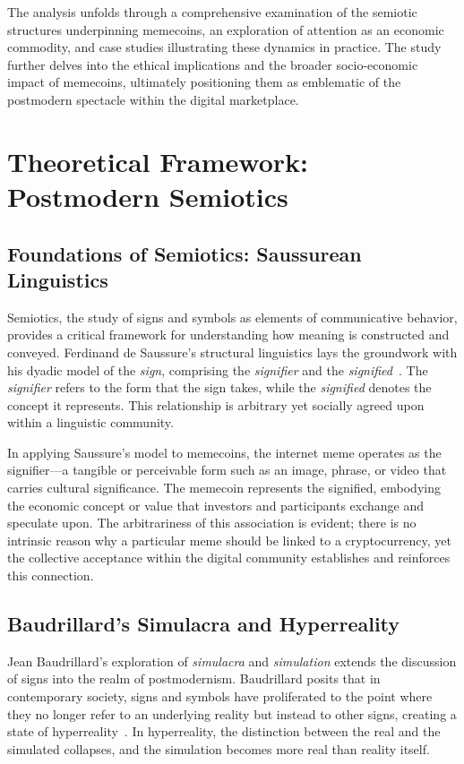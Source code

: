 \documentclass[a4paper,12pt]{article}
\begin{document}
The analysis unfolds through a comprehensive examination of the semiotic structures underpinning memecoins, an exploration of attention as an economic commodity, and case studies illustrating these dynamics in practice. The study further delves into the ethical implications and the broader socio-economic impact of memecoins, ultimately positioning them as emblematic of the postmodern spectacle within the digital marketplace.

\section{Theoretical Framework: Postmodern Semiotics}

\subsection{Foundations of Semiotics: Saussurean Linguistics}

Semiotics, the study of signs and symbols as elements of communicative behavior, provides a critical framework for understanding how meaning is constructed and conveyed. Ferdinand de Saussure's structural linguistics lays the groundwork with his dyadic model of the \textit{sign}, comprising the \textit{signifier} and the \textit{signified}~\cite{saussure1986course}. The \textit{signifier} refers to the form that the sign takes, while the \textit{signified} denotes the concept it represents. This relationship is arbitrary yet socially agreed upon within a linguistic community.

In applying Saussure's model to memecoins, the internet meme operates as the signifier—a tangible or perceivable form such as an image, phrase, or video that carries cultural significance. The memecoin represents the signified, embodying the economic concept or value that investors and participants exchange and speculate upon. The arbitrariness of this association is evident; there is no intrinsic reason why a particular meme should be linked to a cryptocurrency, yet the collective acceptance within the digital community establishes and reinforces this connection.

\subsection{Baudrillard's Simulacra and Hyperreality}

Jean Baudrillard's exploration of \textit{simulacra} and \textit{simulation} extends the discussion of signs into the realm of postmodernism. Baudrillard posits that in contemporary society, signs and symbols have proliferated to the point where they no longer refer to an underlying reality but instead to other signs, creating a state of hyperreality~\cite{baudrillard1994simulacra}. In hyperreality, the distinction between the real and the simulated collapses, and the simulation becomes more real than reality itself.
\end{document}
